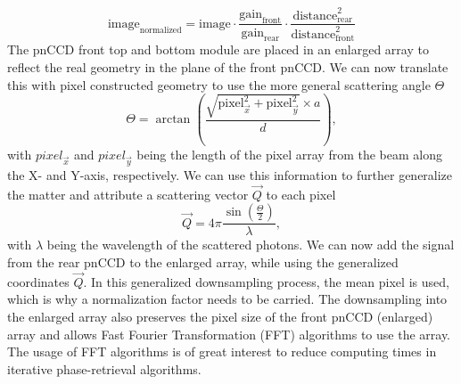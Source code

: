 \begin{equation}
\text{image}_{\text{normalized}} = \text{image}\cdot \frac{\text{gain}_{\text{front}}}{\text{gain}_{\text{rear}}} \cdot \frac{\text{distance}_{\text{rear}}^{2}}{\text{distance}_{\text{front}}^{2}}
\end{equation}
The pnCCD front top and bottom module are placed in an enlarged array to reflect the real geometry in the plane of the front pnCCD. We can now translate this with pixel constructed geometry to use the more general scattering angle $\Theta$
\begin{equation}
\Theta = \arctan\left(\frac{\sqrt{\text{pixel}_{\vec{x}}^{2}+\text{pixel}_{\vec{y}}^{2}}\times a}{d}\right),
\label{eqn:scattering-angle}
\end{equation}
with $pixel_{\vec{x}}$ and $pixel_{\vec{y}}$ being the length of the pixel array from the beam along the X- and Y-axis, respectively. We can use this information to further generalize the matter and attribute a scattering vector $\vec{Q}$ to each pixel
\begin{equation}
\vec{Q} = 4 \pi \frac{\sin\left(\frac{\Theta}{2}\right)}{\lambda},
\label{eqn:q-vector}
\end{equation}
with $\lambda$ being the wavelength of the scattered photons. We can now add the signal from the rear pnCCD to the enlarged array, while using the generalized coordinates $\vec{Q}$. In this generalized downsampling process, the mean pixel is used, which is why a normalization factor needs to be carried. The downsampling into the enlarged array also  preserves the pixel size of the front pnCCD (enlarged) array and allows Fast Fourier Transformation (FFT) algorithms to use the array. The usage of FFT algorithms is of great interest to reduce computing times in iterative phase-retrieval algorithms.\\
%
%
%
